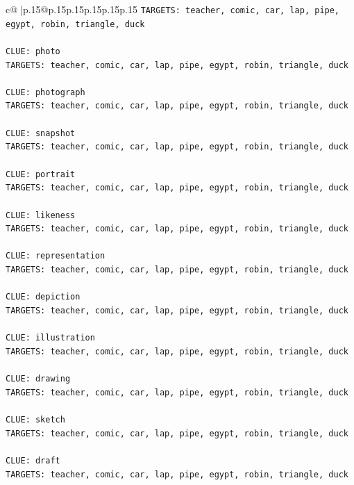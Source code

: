 \documentclass{article}
\begin{document}
{\begin{supertabular}{c@{$\;$}|p{.15\linewidth}@{}p{.15\linewidth}p{.15\linewidth}p{.15\linewidth}p{.15\linewidth}p{.15\linewidth}}
{{{\texttt{TARGETS: teacher, comic, car, lap, pipe, egypt, robin, triangle, duck} \\
\\ 
\texttt{CLUE: photo} \\
\texttt{TARGETS: teacher, comic, car, lap, pipe, egypt, robin, triangle, duck} \\
\\ 
\texttt{CLUE: photograph} \\
\texttt{TARGETS: teacher, comic, car, lap, pipe, egypt, robin, triangle, duck} \\
\\ 
\texttt{CLUE: snapshot} \\
\texttt{TARGETS: teacher, comic, car, lap, pipe, egypt, robin, triangle, duck} \\
\\ 
\texttt{CLUE: portrait} \\
\texttt{TARGETS: teacher, comic, car, lap, pipe, egypt, robin, triangle, duck} \\
\\ 
\texttt{CLUE: likeness} \\
\texttt{TARGETS: teacher, comic, car, lap, pipe, egypt, robin, triangle, duck} \\
\\ 
\texttt{CLUE: representation} \\
\texttt{TARGETS: teacher, comic, car, lap, pipe, egypt, robin, triangle, duck} \\
\\ 
\texttt{CLUE: depiction} \\
\texttt{TARGETS: teacher, comic, car, lap, pipe, egypt, robin, triangle, duck} \\
\\ 
\texttt{CLUE: illustration} \\
\texttt{TARGETS: teacher, comic, car, lap, pipe, egypt, robin, triangle, duck} \\
\\ 
\texttt{CLUE: drawing} \\
\texttt{TARGETS: teacher, comic, car, lap, pipe, egypt, robin, triangle, duck} \\
\\ 
\texttt{CLUE: sketch} \\
\texttt{TARGETS: teacher, comic, car, lap, pipe, egypt, robin, triangle, duck} \\
\\ 
\texttt{CLUE: draft} \\
\texttt{TARGETS: teacher, comic, car, lap, pipe, egypt, robin, triangle, duck} \\
}}}
\end{supertabular}}
\end{document}
